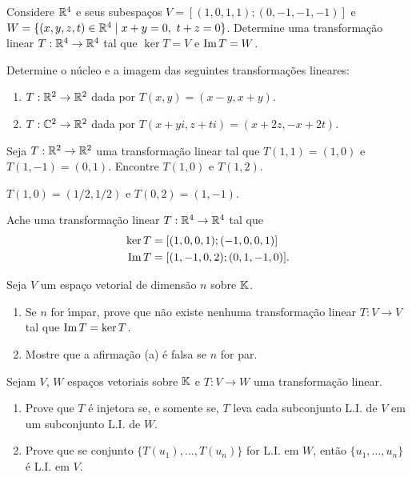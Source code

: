 \documentclass[12pt]{exam}
\begin{document}
\begin{exercicio}
	Considere $\mathbb{R}^4$ e seus subespa\c{c}os $V = [(1,0,1,1);(0,-1,-1,-1)]$ e $W = \{(x,y,z,t) \in \mathbb{R}^4 \mid x + y = 0,\ t + z = 0\}$. Determine uma transforma\c{c}\~ao linear $T : \mathbb{R}^4 \to \mathbb{R}^4$ tal que $\ker T = V$ e ${\rm Im\,} T = W$.
\end{exercicio}

\begin{exercicio}
	Determine o n\'ucleo e a imagem das seguintes transforma\c{c}\~oes lineares:
	\begin{enumerate}[label=({\alph*})]
		\item $T : \mathbb{R}^2 \to \mathbb{R}^2$ dada por $T(x,y) = (x - y, x + y)$.
		\item $T : \mathbb{C}^2 \to \mathbb{R}^2$ dada por $T(x + yi,z + ti) = (x + 2z, -x + 2t)$.
	\end{enumerate}
\end{exercicio}

\begin{exercicio}
	Seja $T : \mathbb{R}^2 \to \mathbb{R}^2$ uma transforma\c{c}\~ao linear tal que $T(1,1) = (1,0)$ e $T(1,-1) = (0,1)$. Encontre $T(1,0)$ e $T(1,2)$.
	\begin{solucao}
		$T(1,0) = (1/2,1/2)$ e $T(0,2) = (1,-1)$.
	\end{solucao}
\end{exercicio}

\begin{exercicio}
	Ache uma transforma\c{c}\~ao linear $T : \mathbb{R}^4 \to \mathbb{R}^4$ tal que
	\begin{align*}
		\ker T &= [(1,0,0,1);(-1,0,0,1)]\\
		{\rm Im\,} T &= [(1,-1,0,2);(0,1,-1,0)].
	\end{align*}
\end{exercicio}

\begin{exercicio}
	Seja $V$ um espa\c{c}o vetorial de dimens\~ao $n$ sobre $\mathbb{K}$.
	\begin{enumerate}[label=({\alph*})]
		\item Se $n$ for {\'\i}mpar, prove que n\~ao existe nenhuma transforma\c{c}\~ao linear $T : V \to V$ tal que ${\rm Im\,} T = \ker T$.
		\item Mostre que a afirma\c{c}\~ao (a) \'e falsa se $n$ for par.
	\end{enumerate}
\end{exercicio}

\begin{exercicio}
	Sejam $V$, $W$ espa\c{c}os vetoriais sobre $\mathbb{K}$ e $T : V \to W$ uma transforma\c{c}\~ao linear.
	\begin{enumerate}[label=({\alph*})]
		\item Prove que $T$ \'e injetora se, e somente se, $T$ leva cada subconjunto L.I. de $V$ em um subconjunto L.I. de $W$.
		\item Prove que se  conjunto $\{T(u_1),\dots,T(u_n)\}$ for L.I. em $W$, ent\~ao $\{u_1,\dots,u_n\}$ \'e L.I. em $V$.
	\end{enumerate}
\end{exercicio}
\end{document}
